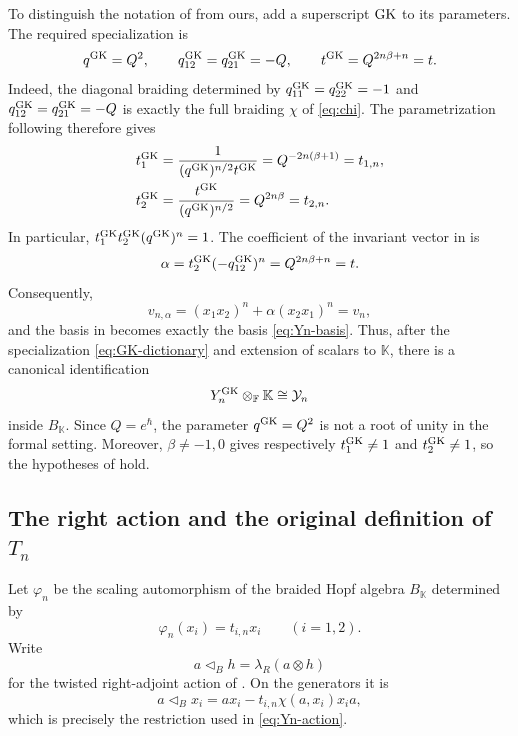 \documentclass[11pt,a4paper]{article}
\newcommand{\hK}{\mathbb K}
\newcommand{\ot}{\otimes}
\newcommand{\tri}{\mathbin{\triangleleft}}
\theoremstyle{definition}
\theoremstyle{remark}
\begin{document}
To distinguish the notation of \cite{GK} from ours, add a superscript
\({\rm GK}\) to its parameters.  The required specialization is
\begin{equation}\label{eq:GK-dictionary}
 q^{\rm GK}=Q^2,\qquad
 q_{12}^{\rm GK}=q_{21}^{\rm GK}=-Q,\qquad
 t^{\rm GK}=Q^{2n\beta+n}=t.
\end{equation}
Indeed, the diagonal braiding determined by
\(q_{11}^{\rm GK}=q_{22}^{\rm GK}=-1\) and
\(q_{12}^{\rm GK}=q_{21}^{\rm GK}=-Q\) is exactly the full braiding
\(\chi\) of \eqref{eq:chi}.  The parametrization following
\cite[Proposition~7.4]{GK} therefore gives
\begin{equation}\label{eq:GK-t1-t2}
 \begin{aligned}
 t_1^{\rm GK}
 &=\frac{1}{(q^{\rm GK})^{n/2}t^{\rm GK}}
   =Q^{-2n(\beta+1)}=t_{1,n},\\
 t_2^{\rm GK}
 &=\frac{t^{\rm GK}}{(q^{\rm GK})^{n/2}}
   =Q^{2n\beta}=t_{2,n}.
 \end{aligned}
\end{equation}
In particular, \(t_1^{\rm GK}t_2^{\rm GK}(q^{\rm GK})^n=1\).
The coefficient of the invariant vector in \cite[(110)--(113)]{GK} is
\begin{equation}\label{eq:GK-alpha}
 \alpha=t_2^{\rm GK}(-q_{12}^{\rm GK})^n
 =Q^{2n\beta+n}=t.
\end{equation}
Consequently,
\[
 v_{n,\alpha}=(x_1x_2)^n+\alpha(x_2x_1)^n=v_n,
\]
and the basis in \cite[Proposition~7.4]{GK} becomes exactly the basis
\eqref{eq:Yn-basis}.  Thus, after the specialization
\eqref{eq:GK-dictionary} and extension of scalars to \(\hK\), there is a
canonical identification
\begin{equation}\label{eq:GK-space-identification}
 Y_n^{\rm GK}\otimes_{\mathbb F}\hK\cong\mathcal Y_n
\end{equation}
inside \(B_{\hK}\).  Since \(Q=e^\hbar\), the parameter \(q^{\rm GK}=Q^2\)
is not a root of unity in the formal setting.  Moreover,
\(\beta\ne-1,0\) gives respectively
\(t_1^{\rm GK}\ne1\) and \(t_2^{\rm GK}\ne1\), so the hypotheses of
\cite[Proposition~7.4]{GK} hold.

\subsection{The right action and the original definition of
\texorpdfstring{\(T_n\)}{Tn}}
\label{app:GK-action}

Let \(\varphi_n\) be the scaling automorphism of the braided Hopf algebra
\(B_{\hK}\) determined by
\begin{equation}\label{eq:GK-scaling}
 \varphi_n(x_i)=t_{i,n}x_i\qquad(i=1,2).
\end{equation}
Write
\[
 a\tri_B h=\lambda_R(a\ot h)
\]
for the twisted right-adjoint action of \cite[Theorem~3.5]{GK}.  On the
generators it is
\begin{equation}\label{eq:GK-right-action}
 a\tri_B x_i
 =ax_i-t_{i,n}\chi(a,x_i)x_i a,
\end{equation}
which is precisely the restriction used in \eqref{eq:Yn-action}.
\end{document}
